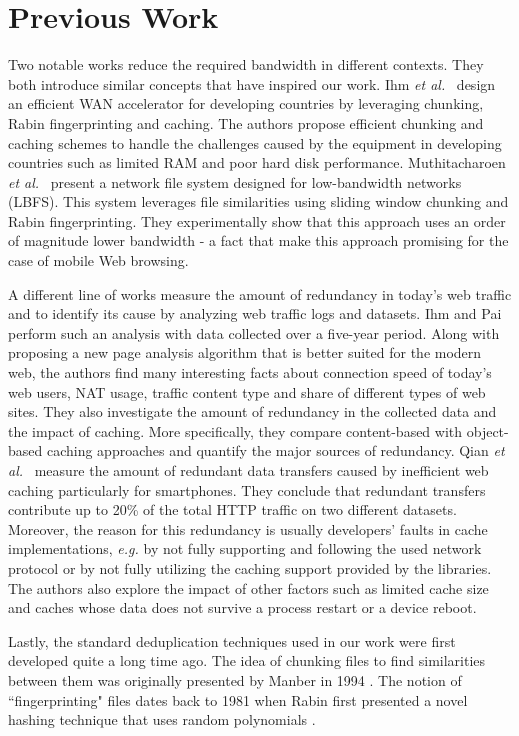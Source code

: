 \section{Previous Work}\label{sec:rel_work}
Two notable works reduce the required bandwidth in different contexts. They both introduce similar concepts that have
inspired our work. Ihm \textit{et al.}~\cite{wanax} design an efficient WAN accelerator for developing countries by leveraging chunking, Rabin fingerprinting and caching. 
The authors propose efficient chunking and caching schemes to handle the challenges caused by the equipment in developing countries such as limited RAM and poor hard disk performance. Muthitacharoen \textit{et al.}~\cite{lbfs} present a network file system designed for low-bandwidth networks (LBFS). This system leverages file similarities using sliding window chunking and Rabin fingerprinting. They experimentally show that this approach uses an order of
magnitude lower bandwidth - a fact that make this approach promising for the case of mobile Web browsing.

A different line of works measure the amount of redundancy in today's web traffic and to identify its cause by
analyzing web traffic logs and datasets. Ihm and Pai~\cite{modern_web_traffic} perform such an analysis %
with data collected over a five-year period. Along with proposing a new page analysis algorithm 
that is better suited for the modern web, the authors find many interesting facts about connection speed of today's web users, NAT usage, traffic content type and share of different types of web sites. They also investigate the amount of redundancy in the collected data and the impact of caching. More specifically, they compare content-based with object-based caching approaches and quantify the major sources of redundancy. Qian \textit{et al.}~\cite{web_caching} measure the amount of redundant data transfers caused by inefficient web caching particularly for smartphones. They conclude that redundant transfers contribute up to 20\% of the total HTTP traffic on two different datasets. Moreover, the reason for this redundancy is usually developers' faults in cache implementations, \textit{e.g.} by not fully supporting and following the used network protocol or by not fully utilizing the caching support provided by the libraries. The authors also explore the impact of other factors such as limited cache size and caches whose data does not survive a process restart or a device reboot.

Lastly, the standard deduplication techniques used in our work were first developed quite a long time ago. The idea of chunking files to find 
similarities between them was originally presented by Manber in 1994 \cite{manber}. The notion of ``fingerprinting" 
files dates back to 1981 when Rabin first presented a novel hashing technique that uses random polynomials \cite{rabin}.
